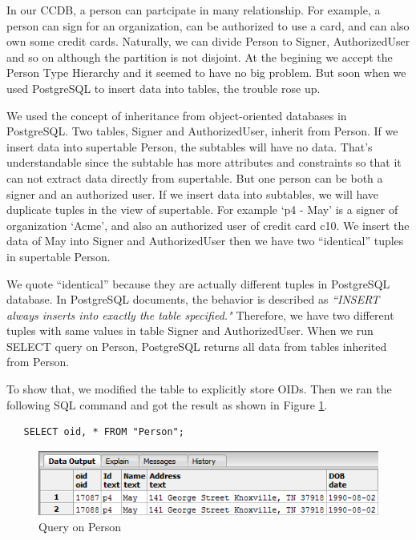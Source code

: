 \documentclass[11pt]{article}
\begin{document}
\par
In our CCDB, a person can partcipate in many relationship. For example, a person can sign for an organization, can be authorized to use a card, and can also own some credit cards. Naturally, we can divide Person to Signer, AuthorizedUser and so on although the partition is not disjoint. At the begining we accept the Person Type Hierarchy and it seemed to have no big problem. But soon when we used PostgreSQL to insert data into tables, the trouble rose up.

\par
We used the concept of inheritance from object-oriented databases in PostgreSQL. Two tables, Signer and AuthorizedUser, inherit from Person. If we insert data into supertable Person, the subtables will have no data. That's understandable since the subtable has more attributes and constraints so that it can not extract data directly from supertable. But one person can be both a signer and an authorized user. If we insert data into subtables, we will have duplicate tuples in the view of supertable. For example `p4 - May' is a signer of organization `Acme', and also an authorized user of credit card c10. We insert the data of May into Signer and AuthorizedUser then we have two ``identical'' tuples in supertable Person.

\par
We quote ``identical'' because they are actually different tuples in PostgreSQL database. In PostgreSQL documents, the behavior is described as \emph{``INSERT always inserts into exactly the table specified."} Therefore, we have two different tuples with same values in table Signer and AuthorizedUser. When we run SELECT query on Person, PostgreSQL returns all data from tables inherited from Person.

\par
To show that, we modified the table to explicitly store OIDs. Then we ran the following SQL command and got the result as shown in Figure \ref{fig:qonperson}.
\begin{verbatim}
   SELECT oid, * FROM "Person";
\end{verbatim}

\begin{figure}[!htp]
\centering
\includegraphics{F4.png}
\caption{Query on Person}
\label{fig:qonperson}
\end{figure}
\end{document}
